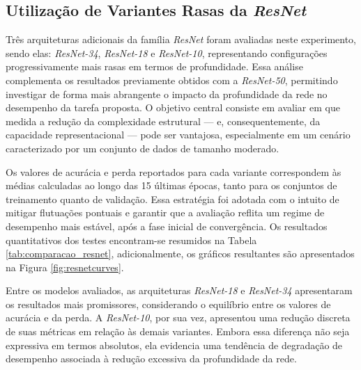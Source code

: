  
\subsection{Utilização de Variantes Rasas da \textit{ResNet}} 

Três arquiteturas adicionais da família \textit{ResNet} foram avaliadas neste experimento, sendo elas: \textit{ResNet-34}, \textit{ResNet-18} e \textit{ResNet-10}, representando configurações progressivamente mais rasas em termos de profundidade. Essa análise complementa os resultados previamente obtidos com a \textit{ResNet-50}, permitindo investigar de forma mais abrangente o impacto da profundidade da rede no desempenho da tarefa proposta. O objetivo central consiste em avaliar em que medida a redução da complexidade estrutural — e, consequentemente, da capacidade representacional — pode ser vantajosa, especialmente em um cenário caracterizado por um conjunto de dados de tamanho moderado. 

Os valores de acurácia e perda reportados para cada variante correspondem às médias calculadas ao longo das 15 últimas épocas, tanto para os conjuntos de treinamento quanto de validação. Essa estratégia foi adotada com o intuito de mitigar flutuações pontuais e garantir que a avaliação reflita um regime de desempenho mais estável, após a fase inicial de convergência. Os resultados quantitativos dos testes encontram-se resumidos na Tabela \ref{tab:comparacao_resnet}, adicionalmente, os gráficos resultantes são apresentados na Figura \ref{fig:resnetcurves}.

Entre os modelos avaliados, as arquiteturas \textit{ResNet-18} e \textit{ResNet-34} apresentaram os resultados mais promissores, considerando o equilíbrio entre os valores de acurácia e da perda. A \textit{ResNet-10}, por sua vez, apresentou uma redução discreta de suas métricas em relação às demais variantes. Embora essa diferença não seja expressiva em termos absolutos, ela evidencia uma tendência de degradação de desempenho associada à redução excessiva da profundidade da rede.

